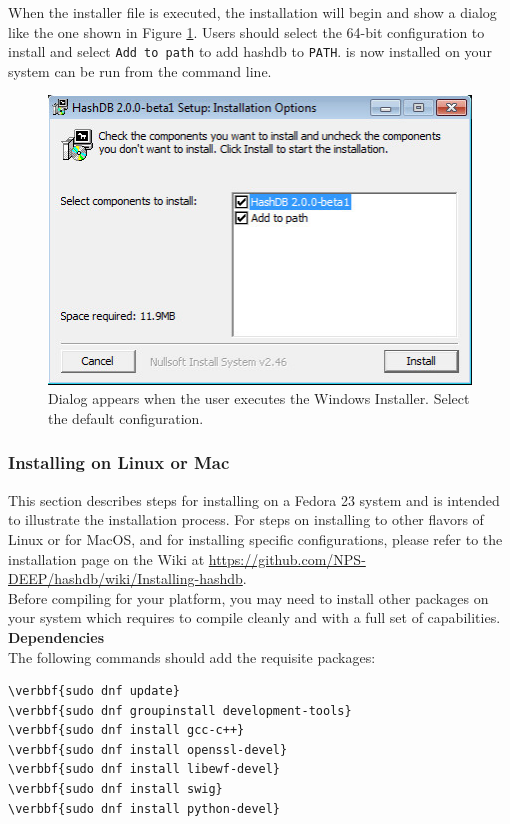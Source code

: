 \documentclass[11pt,fleqn]{article} %
\begin{document}
When the installer file is executed, the installation will begin and show a dialog like the one shown in Figure \ref{fig:windowsInstaller}.  Users should select the 64-bit configuration to install \hdb and select \verb+Add to path+ to add hashdb to \verb+PATH+. \hdb is now installed on your system can be run from the command line.\\

\begin{figure}
	\center
	\includegraphics[scale=.8]{WindowsInstaller.png}
	\caption{Dialog appears when the user executes the Windows Installer. Select the default configuration.}
	\label{fig:windowsInstaller}
\end{figure}

\subsubsection{Installing on Linux or Mac}
This section describes steps for installing \hdb on a Fedora 23 system and is intended to illustrate the installation process.  For steps on installing \hdb to other flavors of Linux or for MacOS, and for installing specific configurations, please refer to the installation page on the \hdb Wiki at \url{https://github.com/NPS-DEEP/hashdb/wiki/Installing-hashdb}.\\

Before compiling \hdb for your platform, you may need to install other packages on your system which \hdb requires to compile cleanly and with a full set of capabilities.\\

\textbf{Dependencies}\\
The following commands should add the requisite packages:
\begin{Verbatim}[commandchars=\\\{\}]
\verbbf{sudo dnf update}
\verbbf{sudo dnf groupinstall development-tools}
\verbbf{sudo dnf install gcc-c++}
\verbbf{sudo dnf install openssl-devel}
\verbbf{sudo dnf install libewf-devel}
\verbbf{sudo dnf install swig}
\verbbf{sudo dnf install python-devel}
\end{Verbatim}
\end{document}
